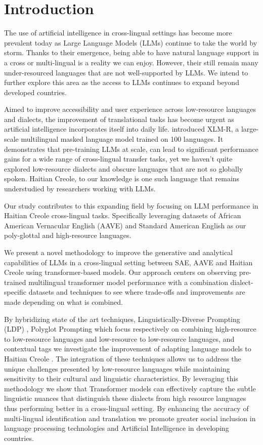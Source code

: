 \section{Introduction}
\label{sec:introduction}

The use of artificial intelligence in cross-lingual settings has become more prevalent today as Large Language Models (LLMs) continue to take the world by storm. Thanks to their emergence, being able to have natural language support in a cross or multi-lingual is a reality we can enjoy. However, their still remain many under-resourced languages that are not well-supported by LLMs. We intend to further explore this area as the access to LLMs continues to expand beyond developed countries. 

Aimed to improve accessibility and user experience across low-resource languages and dialects, the improvement of translational tasks has become urgent as artificial intelligence incorporates itself into daily life. \cite{Conneau:20} introduced XLM-R, a large-scale multilingual masked language model trained on 100 languages. It demonstrates that pre-training LLMs at scale, can lead to significant performance gains for a wide range of cross-lingual transfer tasks, yet we haven't quite explored low-resource dialects and obscure languages that are not so globally spoken. Haitian Creole, to our knowledge is one such language that remains understudied by researchers working with LLMs.

Our study contributes to this expanding field by focusing on LLM performance in Haitian Creole cross-lingual tasks. Specifically leveraging datasets of African American Vernacular English (AAVE) and Standard American English as our poly-glottal and high-resource languages. 

We present a novel methodology to improve the generative and analytical capabilities of LLMs in a cross-lingual setting between SAE, AAVE and Haitian Creole using transformer-based models. Our approach centers on observing pre-trained multilingual transformer model performance with a combination dialect-specific datasets and techniques to see where trade-offs and improvements are made depending on what is combined. 

By hybridizing state of the art techniques, Linguistically-Diverse Prompting (LDP) \cite{Nguyen:24}, Polyglot Prompting \cite{Ng:22} which focus respectively on combining high-resource to low-resource languages and low-resource to low-resource languages, and contextual tags we investigate the improvement of adapting language models to Haitian Creole \cite{Upadhayay2024}. The integration of these techniques allows us to address the unique challenges presented by low-resource languages while maintaining sensitivity to their cultural and linguistic characteristics. By leveraging this methodology we show that Transformer models can effectively capture the subtle linguistic nuances that distinguish these dialects from high resource languages thus performing better in a cross-lingual setting. By enhancing the accuracy of multi-lingual identification and translation we promote greater social inclusion in language processing technologies and Artificial Intelligence in developing countries. 


